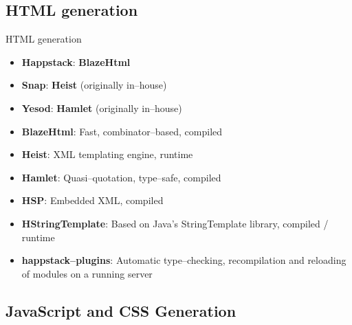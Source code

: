 \documentclass[10pt,usenames,dvipsnames]{beamer}
\begin{document}
	\subsection*{HTML generation}
	
	\begin{frame}{HTML generation}
		\begin{itemize}
		\item \textbf{Happstack}: \textbf{BlazeHtml}
		\item\textbf{Snap}: \textbf{Heist} (originally in--house)
		\item \textbf{Yesod}: \textbf{Hamlet} (originally in--house)
		\end{itemize}

		\begin{itemize}
		\item \textbf{BlazeHtml}: Fast, combinator--based, compiled
		\item\textbf{Heist}: XML templating engine, runtime
		\item \textbf{Hamlet}: Quasi--quotation, type--safe, compiled
		\item \textbf{HSP}: Embedded XML, compiled
		\item \textbf{HStringTemplate}: Based on Java's StringTemplate library, compiled / runtime
		\end{itemize}

		\begin{itemize}
		\item \textbf{happstack--plugins}: Automatic type--checking, recompilation and reloading of modules on a running server
		\end{itemize}
	\end{frame}
	
	\subsection*{JavaScript and CSS Generation}
	
\end{document}
